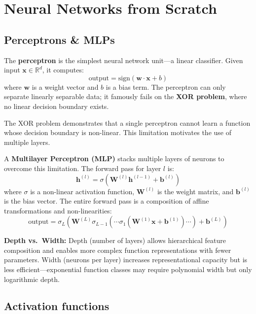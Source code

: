 
\section{Neural Networks from Scratch}

\subsection{Perceptrons \& MLPs}

The \textbf{perceptron} is the simplest neural network unit---a linear classifier. Given input $\mathbf{x} \in \mathbb{R}^d$, it computes:
\[
\text{output} = \text{sign}(\mathbf{w} \cdot \mathbf{x} + b)
\]
where $\mathbf{w}$ is a weight vector and $b$ is a bias term. The perceptron can only separate linearly separable data; it famously fails on the \textbf{XOR problem}, where no linear decision boundary exists.

\begin{intuitionbox}
The XOR problem demonstrates that a single perceptron cannot learn a function whose decision boundary is non-linear. This limitation motivates the use of multiple layers.
\end{intuitionbox}

A \textbf{Multilayer Perceptron (MLP)} stacks multiple layers of neurons to overcome this limitation. The forward pass for layer $l$ is:
\[
\mathbf{h}^{(l)} = \sigma\left(\mathbf{W}^{(l)} \mathbf{h}^{(l-1)} + \mathbf{b}^{(l)}\right)
\]
where $\sigma$ is a non-linear activation function, $\mathbf{W}^{(l)}$ is the weight matrix, and $\mathbf{b}^{(l)}$ is the bias vector. The entire forward pass is a composition of affine transformations and non-linearities:
\[
\text{output} = \sigma_L(\mathbf{W}^{(L)} \sigma_{L-1}(\cdots \sigma_1(\mathbf{W}^{(1)} \mathbf{x} + \mathbf{b}^{(1)}) \cdots ) + \mathbf{b}^{(L)})
\]

\begin{notebox}
\textbf{Depth vs.~Width:}
Depth (number of layers) allows hierarchical feature composition and enables more complex function representations with fewer parameters. Width (neurons per layer) increases representational capacity but is less efficient---exponential function classes may require polynomial width but only logarithmic depth.
\end{notebox}


\subsection{Activation functions}

